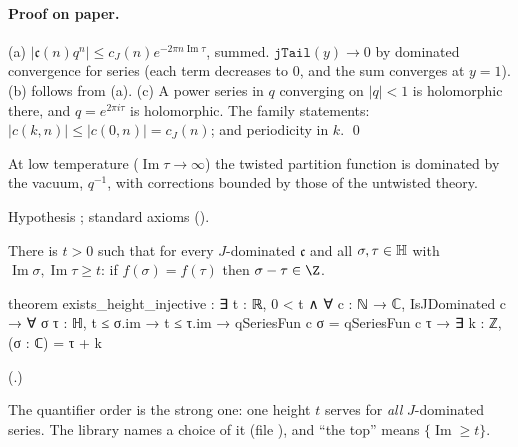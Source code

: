 \paragraph{Proof on paper.}  (a) $|\mathfrak c(n)q^n|\le c_J(n)e^{-2\pi n\operatorname{Im}\tau}$, summed.  $\mathtt{jTail}(y)\to0$ by dominated
convergence for series (each term decreases to $0$, and the sum converges at $y=1$).  (b) follows from (a).  (c) A power series
in $q$ converging on $|q|<1$ is holomorphic there, and $q=e^{2\pi i\tau}$ is holomorphic.  The family statements: $|c(k,n)|\le|c(0,n)|=
c_J(n)$; and periodicity in $k$. \qed
\begin{physics}At low temperature ($\operatorname{Im}\tau\to\infty$) the twisted partition function is dominated by the
vacuum, $q^{-1}$, with corrections bounded by those of the untwisted theory.\end{physics}
\begin{status}Hypothesis ; standard axioms ().\end{status}

\begin{theorem}\label{ch19:thm:topinj}
There is $t>0$ such that for every $J$-dominated $\mathfrak c$ and all $\sigma,\tau\in\mathbb{H}$ with $\operatorname{Im}\sigma,
\operatorname{Im}\tau\ge t$: if $f(\sigma)=f(\tau)$ then $\sigma-\tau\in\Z$.
\end{theorem}
\begin{leancode}
theorem exists_height_injective :
    ∃ t : ℝ, 0 < t ∧ ∀ c : ℕ → ℂ, IsJDominated c → ∀ σ τ : ℍ, t ≤ σ.im → t ≤ τ.im →
      qSeriesFun c σ = qSeriesFun c τ → ∃ k : ℤ, (σ : ℂ) = τ + k
\end{leancode}
(.)
\begin{dictionary}
The quantifier order is the strong one: one height $t$ serves for \emph{all} $J$-dominated series.  The library names a
choice of it  (file ), and ``the top'' means $\{\operatorname{Im}\ge t\}$.
\end{dictionary}
